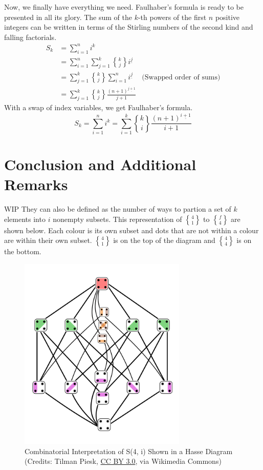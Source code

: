 \documentclass[a4paper]{article}
\theoremstyle{definition}
\begin{document}
Now, we finally have everything we need.
Faulhaber's formula is ready to be presented in all its glory.
The sum of the $k$-th powers of the first $n$ positive integers can be written in terms of the Stirling numbers of the second kind and falling factorials.
\begin{align*}
    S_k & = \sum_{i=1}^n i^k                                                                              \\
        & = \sum_{i=1}^n \sum_{j=1}^k {k\brace j} i^{\underline{j}}                                       \\
        & = \sum_{j=1}^k {k\brace j} \sum_{i=1}^n i^{\underline{j}}      & \text{(Swapped order of sums)} \\
        & = \sum_{j=1}^k {k\brace j} \frac{(n+1)^{\underline{j+1}}}{j+1}
\end{align*}
With a swap of index variables, we get Faulhaber's formula.
\begin{equation}
    S_k = \sum_{i=1}^n i^k = \sum_{i=1}^k {k\brace i} \frac{(n+1)^{\underline{i+1}}}{i+1}
\end{equation}

\section{Conclusion and Additional Remarks}

WIP
They can also be defined as the number of ways to partion a set of $k$ elements into $i$ nonempty subsets.
This representation of $4\brace 1$ to $f\brace 4$ are shown below.
Each colour is its own subset and dots that are not within a colour are within their own subset.
$4\brace 1$ is on the top of the diagram and $4\brace 4$ is on the bottom.

\begin{figure}[H]
    \centering
    \includegraphics[width=8cm, keepaspectratio]{hasse_diagram.png}
    \captionsetup{justification=centering}
    \caption{Combinatorial Interpretation of S(4, i) Shown in a Hasse Diagram
        \\(Credits: Tilman Piesk, \href{https://creativecommons.org/licenses/by/3.0/}{CC BY 3.0}, via Wikimedia Commons)}
    \label{fig:fig1}
\end{figure}
\end{document}
